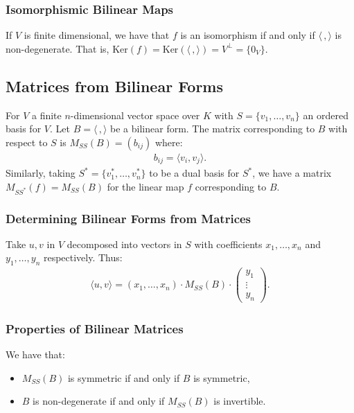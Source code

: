 \subsubsection{Isomorphismic Bilinear Maps}

If $V$ is finite dimensional, we have that $f$ is an isomorphism if and only if 
$\langle \, , \rangle$ is non-degenerate. That is, $\text{Ker}(f) 
= \text{Ker}(\langle \, , \rangle) = V^\perp = \{0_V\}$.

\subsection{Matrices from Bilinear Forms}

For $V$ a finite $n$-dimensional vector space over $K$ with $S = \{v_1, \ldots, v_n\}$
an ordered basis for $V$. Let $B = \langle \, , \rangle$ be a bilinear form. The matrix corresponding
to $B$ with respect to $S$ is $M_{SS}(B) = (b_{ij})$ where: \begin{gather*}
  b_{ij} = \langle v_i, v_j \rangle.
\end{gather*} Similarly, taking $S^* = \{v^*_1, \ldots, v^*_n\}$ to be a dual basis for
$S^*$, we have a matrix $M_{SS^*}(f) = M_{SS}(B)$ for the linear map $f$ corresponding to $B$.

\subsubsection{Determining Bilinear Forms from Matrices}

Take $u, v$ in $V$ decomposed into vectors in $S$ with coefficients $x_1, \ldots, x_n$
and $y_1, \ldots, y_n$ respectively. Thus: \begin{gather*}
  \langle u, v \rangle = (x_1, \ldots, x_n) \cdot M_{SS}(B) \cdot \begin{pmatrix}
    y_1 \\ \vdots \\ y_n
  \end{pmatrix}.
\end{gather*}

\subsubsection{Properties of Bilinear Matrices}

We have that: \begin{itemize}
  \item $M_{SS}(B)$ is symmetric if and only if $B$ is symmetric,
  \item $B$ is non-degenerate if and only if $M_{SS}(B)$ is invertible.
\end{itemize}

